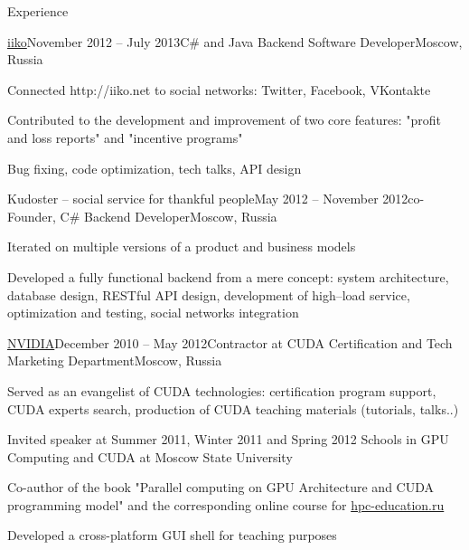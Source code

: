 \documentclass{resume} %
\begin{document}
\begin{rSection}{Experience}

\begin{rSubsection}{\href{http://en.iiko.ru}{iiko}}{November 2012 -- July 2013}{C\# and Java Backend Software Developer}{Moscow, Russia}
\item Connected http://iiko.net to social networks: Twitter, Facebook, VKontakte
\item Contributed to the development and improvement of two core features: "profit and loss reports" and "incentive programs"
\item Bug fixing, code optimization, tech talks, API design
\end{rSubsection}


\begin{rSubsection}{Kudoster -- social service for thankful people}{May 2012 -- November 2012}{co-Founder, C\# Backend Developer}{Moscow, Russia}
\item Iterated on multiple versions of a product and business models
\item Developed a fully functional backend from a mere concept: system architecture, database design, RESTful API design, development of high–load service, optimization and testing, social networks integration
\end{rSubsection}


\begin{rSubsection}{\href{http://nvidia.ru}{NVIDIA}}{December 2010 -- May 2012}{Contractor at CUDA Certification and Tech Marketing Department}{Moscow, Russia}
\item Served as an evangelist of CUDA technologies: certification program support, CUDA experts search, production of CUDA teaching materials (tutorials, talks..)
\item Invited speaker at Summer 2011, Winter 2011 and Spring 2012 Schools in GPU Computing and CUDA at Moscow State University
\item Co-author of the book "Parallel computing on GPU Architecture and CUDA programming model" and the corresponding online course for \href{http://hpc-education.ru}{hpc-education.ru}
\item Developed a cross-platform GUI shell for teaching purposes
\end{rSubsection}



\end{rSection}
\end{document}
